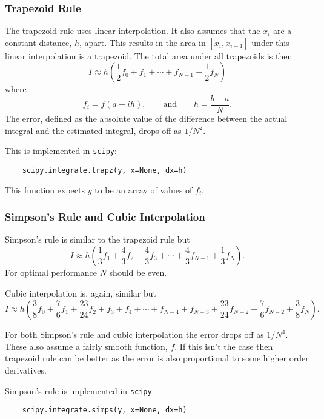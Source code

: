 \documentclass[a4paper]{article}
\begin{document}
    \subsubsection{Trapezoid Rule}
    The trapezoid rule uses linear interpolation.
    It also assumes that the \(x_i\) are a constant distance, \(h\), apart.
    This results in the area in \([x_i, x_{i+1}]\) under this linear interpolation is a trapezoid.
    The total area under all trapezoids is then
    \[I \approx h\left(\frac{1}{2}f_0 + f_1 + \dotsb + f_{N-1} + \frac{1}{2}f_N\right)\]
    where
    \[f_i = f(a + ih),\qquad\text{and}\qquad h = \frac{b - a}{N}.\]
    The error, defined as the absolute value of the difference between the actual integral and the estimated integral, drops off as \(1/N^2\).
    
    This is implemented in \lstinline|scipy|:
    \begin{lstlisting}
    scipy.integrate.trapz(y, x=None, dx=h)
    \end{lstlisting}
    This function expects \(y\) to be an array of values of \(f_i\).
    
    \subsubsection{Simpson's Rule and Cubic Interpolation}
    Simpson's rule is similar to the trapezoid rule but
    \[I \approx h\left(\frac{1}{3}f_1 + \frac{4}{3}f_2 + \frac{4}{3}f_3 + \dotsb + \frac{4}{3}f_{N-1} + \frac{1}{3}f_N\right).\]
    For optimal performance \(N\) should be even.
    
    Cubic interpolation is, again, similar but
    \[I \approx h\left(\frac{3}{8}f_0 + \frac{7}{6}f_1 + \frac{23}{24}f_2 + f_3 + f_4 + \dotsb + f_{N-4} + f_{N-3} + \frac{23}{24}f_{N-2} + \frac{7}{6}f_{N-2} + \frac{3}{8}f_N\right).\]
    
    For both Simpson's rule and cubic interpolation the error drops off as \(1/N^4\).
    These also assume a fairly smooth function, \(f\).
    If this isn't the case then trapezoid rule can be better as the error is also proportional to some higher order derivatives.
    
    Simpson's rule is implemented in \lstinline|scipy|:
    \begin{lstlisting}
    scipy.integrate.simps(y, x=None, dx=h)
    \end{lstlisting}
    
\end{document}
